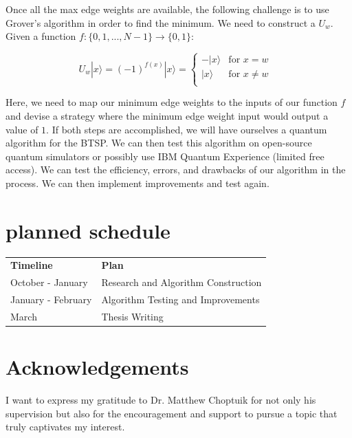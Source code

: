 \documentclass[twocolumn,showpacs,preprintnumbers,amsmath,amssymb]{revtex4}
\begin{document}
	   Once all the max edge weights are available, the following challenge is to use Grover's algorithm in order to find the minimum. We need to construct a  $U_w$. Given a function $f: \{0,1,...,N-1\} \rightarrow \{0,1\}$:
	   
	   \begin{equation}
	   	U_{w}|x\rangle = (-1)^{f(x)}|x\rangle = 
	   	\begin{cases}
	   		-|x\rangle & \text{for  $x=w$ }\\
	   		|x\rangle  & \text{for $x\neq w$}\\
	   	\end{cases}       
	   \end{equation}
		
		Here, we need to map our minimum edge weights to the inputs of our function $f$ and devise a strategy where the minimum edge weight input would output a value of $1$. If both steps are accomplished, we will have ourselves a quantum algorithm for the BTSP. We can then test this algorithm on open-source quantum simulators or possibly use IBM Quantum Experience (limited free access). We can test the efficiency, errors, and drawbacks of our algorithm in the process. We can then implement improvements and test again.
		
		\section{planned schedule}
		
		\begin{table}[!h]
			\begin{tabular}{ll}
				\textbf{Timeline}  & \textbf{Plan}                       \\
				October - January  & Research and Algorithm Construction \\
				January - February & Algorithm Testing and Improvements  \\
				March              & Thesis Writing                     
			\end{tabular}
		\end{table}
		
		\section{Acknowledgements}
		
		I want to express my gratitude to Dr. Matthew Choptuik for not only his supervision but also for the encouragement and support to pursue a topic that truly captivates my interest.
		
\end{document}
